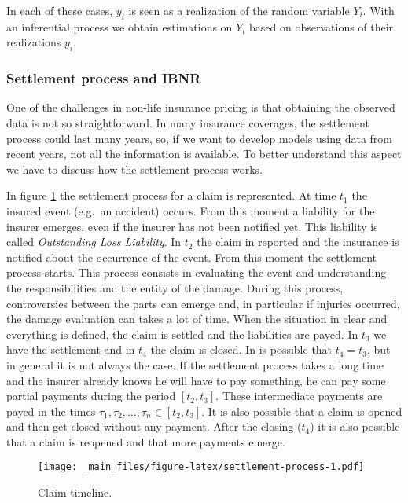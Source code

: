 \documentclass[a4paper, nobind]{templates/ociamthesis}
\theoremstyle{definition}
\theoremstyle{definition}
\theoremstyle{definition}
\theoremstyle{remark}
\begin{document}
In each of these cases, \(y_i\) is seen as a realization of the random variable \(Y_i\). With an inferential process we obtain estimations on \(Y_i\) based on observations of their realizations \(y_i\).

\hypertarget{settlement-process-and-ibnr}{%
\subsubsection{Settlement process and IBNR}\label{settlement-process-and-ibnr}}

One of the challenges in non-life insurance pricing is that obtaining the observed data is not so straightforward. In many insurance coverages, the settlement process could last many years, so, if we want to develop models using data from recent years, not all the information is available. To better understand this aspect we have to discuss how the settlement process works.

In figure \ref{fig:settlement-process} the settlement process for a claim is represented. At time \(t_1\) the insured event (e.g.~an accident) occurs. From this moment a liability for the insurer emerges, even if the insurer has not been notified yet. This liability is called \emph{Outstanding Loss Liability}. In \(t_2\) the claim in reported and the insurance is notified about the occurrence of the event. From this moment the settlement process starts. This process consists in evaluating the event and understanding the responsibilities and the entity of the damage. During this process, controversies between the parts can emerge and, in particular if injuries occurred, the damage evaluation can takes a lot of time. When the situation in clear and everything is defined, the claim is settled and the liabilities are payed. In \(t_3\) we have the settlement and in \(t_4\) the claim is closed. In is possible that \(t_4=t_3\), but in general it is not always the case. If the settlement process takes a long time and the insurer already knows he will have to pay something, he can pay some partial payments during the period \([t_2, t_3]\). These intermediate payments are payed in the times \(\tau_1, \tau_2, \dots, \tau_n \in [t_2, t_3]\). It is also possible that a claim is opened and then get closed without any payment. After the closing (\(t_4\)) it is also possible that a claim is reopened and that more payments emerge.

\begin{figure}
\centering
\texttt{[image: \_main\_files/figure-latex/settlement-process-1.pdf]}
\caption{\label{fig:settlement-process}Claim timeline.}
\end{figure}
\end{document}
